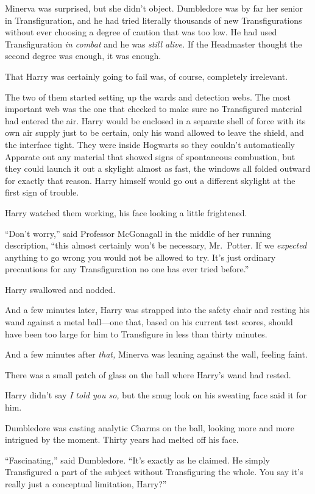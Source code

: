 Minerva was surprised, but she didn't object. Dumbledore was by far her
senior in Transfiguration, and he had tried literally thousands of new
Transfigurations without ever choosing a degree of caution that was too
low. He had used Transfiguration \emph{in combat} and he was \emph{still
alive.} If the Headmaster thought the second degree was enough, it was
enough.

That Harry was certainly going to fail was, of course, completely
irrelevant.

The two of them started setting up the wards and detection webs. The
most important web was the one that checked to make sure no Transfigured
material had entered the air. Harry would be enclosed in a separate
shell of force with its own air supply just to be certain, only his wand
allowed to leave the shield, and the interface tight. They were inside
Hogwarts so they couldn't automatically Apparate out any material that
showed signs of spontaneous combustion, but they could launch it out a
skylight almost as fast, the windows all folded outward for exactly that
reason. Harry himself would go out a different skylight at the first
sign of trouble.

Harry watched them working, his face looking a little frightened.

``Don't worry,'' said Professor McGonagall in the middle of her running
description, ``this almost certainly won't be necessary, Mr.~Potter. If
we \emph{expected} anything to go wrong you would not be allowed to try.
It's just ordinary precautions for any Transfiguration no one has ever
tried before.''

Harry swallowed and nodded.

And a few minutes later, Harry was strapped into the safety chair and
resting his wand against a metal ball---one that, based on his current
test scores, should have been too large for him to Transfigure in less
than thirty minutes.

And a few minutes after \emph{that,} Minerva was leaning against the
wall, feeling faint.

There was a small patch of glass on the ball where Harry's wand had
rested.

Harry didn't say \emph{I told you so,} but the smug look on his sweating
face said it for him.

Dumbledore was casting analytic Charms on the ball, looking more and
more intrigued by the moment. Thirty years had melted off his face.

``Fascinating,'' said Dumbledore. ``It's exactly as he claimed. He
simply Transfigured a part of the subject without Transfiguring the
whole. You say it's really just a conceptual limitation, Harry?''

